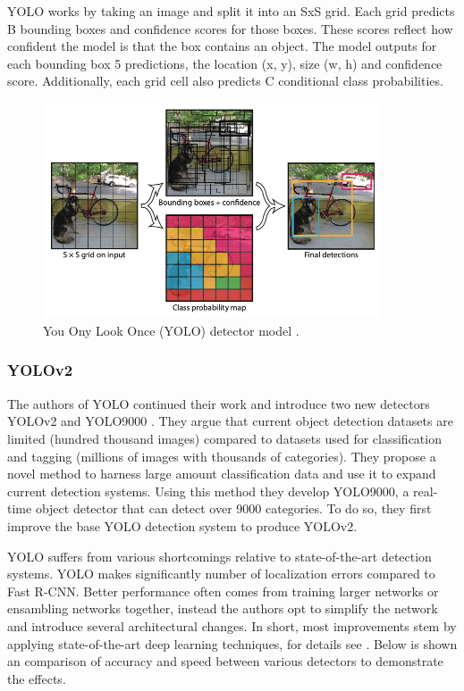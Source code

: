 YOLO works by taking an image and split it into an SxS grid. Each grid predicts B bounding boxes and confidence scores for those boxes. These scores reflect how confident the model is that the box contains an object. The model outputs for each bounding box 5 predictions, the location (x, y), size (w, h) and confidence score. Additionally, each grid cell also predicts C conditional class probabilities. 

\begin{figure}[ht]
\begin{center}
\includegraphics[width=10cm,keepaspectratio]{images/2_literature/yolo.png}
\end{center}
\caption{You Ony Look Once (YOLO) detector model \cite{Redmon2016}.}
\end{figure}


\subsubsection{YOLOv2}
The authors of YOLO continued their work and introduce two new detectors YOLOv2 and YOLO9000 \cite{Redmon2017}. They argue that current object detection datasets are limited (hundred thousand images) compared to datasets used for classification and tagging (millions of images with thousands of categories). They propose a novel method to harness large amount classification data and use it to expand current detection systems. Using this method they develop YOLO9000, a real-time object detector that can detect over 9000 categories. To do so, they first improve the base YOLO detection system to produce YOLOv2. 

YOLO suffers from various shortcomings relative to state-of-the-art detection systems. YOLO makes significantly number of localization errors compared to Fast R-CNN. Better performance often comes from training larger networks or ensambling networks together, instead the authors opt to simplify the network and introduce several architectural changes. In short, most improvements stem by applying state-of-the-art deep learning techniques, for details see \cite{Redmon2017}.  Below is shown an comparison of accuracy and speed between various detectors to demonstrate the effects.


